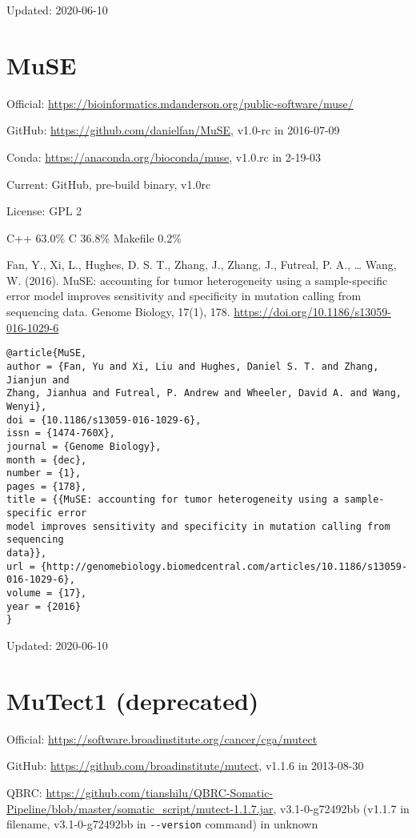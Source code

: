 \documentclass[]{article}
\begin{document}
Updated: 2020-06-10


\section{MuSE}

Official: \url{https://bioinformatics.mdanderson.org/public-software/muse/}

GitHub: \url{https://github.com/danielfan/MuSE}, v1.0-rc in 2016-07-09

Conda: \url{https://anaconda.org/bioconda/muse}, v1.0.rc in 2-19-03

Current: GitHub, pre-build binary, v1.0rc

License: GPL 2

C++ 63.0\% C 36.8\% Makefile 0.2\%

Fan, Y., Xi, L., Hughes, D. S. T., Zhang, J., Zhang, J., Futreal, P. A., … Wang, W. (2016). MuSE: accounting for tumor heterogeneity using a sample-specific error model improves sensitivity and specificity in mutation calling from sequencing data. Genome Biology, 17(1), 178. \url{https://doi.org/10.1186/s13059-016-1029-6}

\begin{verbatim}
@article{MuSE,
author = {Fan, Yu and Xi, Liu and Hughes, Daniel S. T. and Zhang, Jianjun and
Zhang, Jianhua and Futreal, P. Andrew and Wheeler, David A. and Wang, Wenyi},
doi = {10.1186/s13059-016-1029-6},
issn = {1474-760X},
journal = {Genome Biology},
month = {dec},
number = {1},
pages = {178},
title = {{MuSE: accounting for tumor heterogeneity using a sample-specific error
model improves sensitivity and specificity in mutation calling from sequencing
data}},
url = {http://genomebiology.biomedcentral.com/articles/10.1186/s13059-016-1029-6},
volume = {17},
year = {2016}
}
\end{verbatim}

Updated: 2020-06-10

\section{MuTect1 (deprecated)}

Official: \url{https://software.broadinstitute.org/cancer/cga/mutect}

GitHub: \url{https://github.com/broadinstitute/mutect}, v1.1.6 in 2013-08-30

QBRC: \url{https://github.com/tianshilu/QBRC-Somatic-Pipeline/blob/master/somatic_script/mutect-1.1.7.jar}, v3.1-0-g72492bb (v1.1.7 in filename, v3.1-0-g72492bb in \verb|--version| command) in unknown
\end{document}
